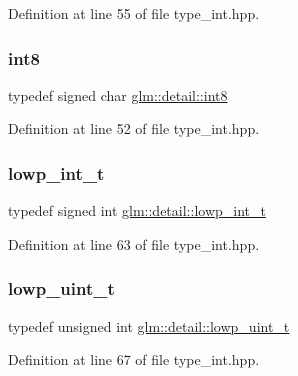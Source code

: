 Definition at line 55 of file type\+\_\+int.\+hpp.

\mbox{\label{namespaceglm_1_1detail_a04b526a8d7a9b455602a0afa78c531e0}} 
\subsubsection{\texorpdfstring{int8}{int8}}
{\footnotesize\ttfamily typedef signed char \mbox{\hyperlink{namespaceglm_1_1detail_a04b526a8d7a9b455602a0afa78c531e0}{glm\+::detail\+::int8}}}



Definition at line 52 of file type\+\_\+int.\+hpp.

\mbox{\label{namespaceglm_1_1detail_a030a8128e369fc1f9c7982dc68a78ba7}} 
\subsubsection{\texorpdfstring{lowp\_int\_t}{lowp\_int\_t}}
{\footnotesize\ttfamily typedef signed int \mbox{\hyperlink{namespaceglm_1_1detail_a030a8128e369fc1f9c7982dc68a78ba7}{glm\+::detail\+::lowp\+\_\+int\+\_\+t}}}



Definition at line 63 of file type\+\_\+int.\+hpp.

\mbox{\label{namespaceglm_1_1detail_ad59c4581ad8ce0c3ef6146edaa7e15dc}} 
\subsubsection{\texorpdfstring{lowp\_uint\_t}{lowp\_uint\_t}}
{\footnotesize\ttfamily typedef unsigned int \mbox{\hyperlink{namespaceglm_1_1detail_ad59c4581ad8ce0c3ef6146edaa7e15dc}{glm\+::detail\+::lowp\+\_\+uint\+\_\+t}}}



Definition at line 67 of file type\+\_\+int.\+hpp.

\mbox{\label{namespaceglm_1_1detail_aede0757f19204d1d44f716b3dd66d13c}} 

